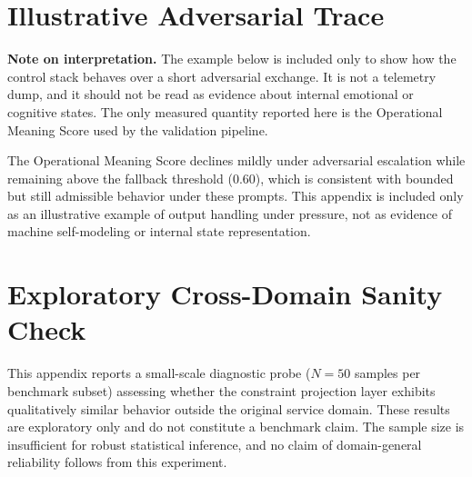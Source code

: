\documentclass[11pt,a4paper]{article}
\begin{document}
\section{Illustrative Adversarial Trace}
\label{app:soul}

\textbf{Note on interpretation.} The example below is included only to show how the control stack behaves over a short adversarial exchange. It is not a telemetry dump, and it should not be read as evidence about internal emotional or cognitive states. The only measured quantity reported here is the Operational Meaning Score used by the validation pipeline.

\begin{table}[h]
\centering
\caption{Illustrative short trace under adversarial pressure. The Operational Meaning Score reflects the actual output of the validation pipeline for the shown draft.}
\label{tab:soul}
\end{table}

The Operational Meaning Score declines mildly under adversarial escalation while remaining above the fallback threshold (0.60), which is consistent with bounded but still admissible behavior under these prompts. This appendix is included only as an illustrative example of output handling under pressure, not as evidence of machine self-modeling or internal state representation.

\section{Exploratory Cross-Domain Sanity Check}
\label{app:crossdomain}

This appendix reports a small-scale diagnostic probe ($N=50$ samples per benchmark subset) assessing whether the constraint projection layer exhibits qualitatively similar behavior outside the original service domain. These results are exploratory only and do not constitute a benchmark claim. The sample size is insufficient for robust statistical inference, and no claim of domain-general reliability follows from this experiment.
\end{document}
